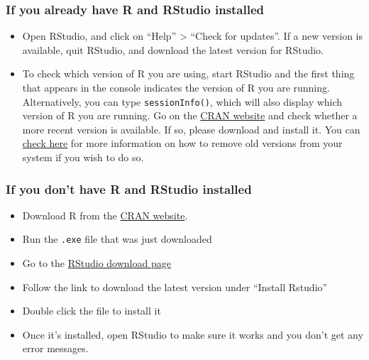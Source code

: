 \documentclass[
]{book}
\providecommand{\tightlist}{%
  \setlength{\itemsep}{0pt}\setlength{\parskip}{0pt}}
\begin{document}
\subsubsection*{If you already have R and RStudio installed}\label{if-you-already-have-r-and-rstudio-installed-1}

\begin{itemize}
\tightlist
\item
  Open RStudio, and click on ``Help'' \textgreater{} ``Check for updates''. If a new version is
  available, quit RStudio, and download the latest version for RStudio.
\item
  To check which version of R you are using, start RStudio and the first thing
  that appears in the console indicates the version of R you are
  running. Alternatively, you can type \texttt{sessionInfo()}, which will also display
  which version of R you are running. Go on
  the \href{https://cran.r-project.org/bin/windows/base/}{CRAN website} and check
  whether a more recent version is available. If so, please download and install
  it. You can \href{https://cran.r-project.org/bin/windows/base/rw-FAQ.html\#How-do-I-UNinstall-R_003f}{check here} for
  more information on how to remove old versions from your system if you wish to do so.
\end{itemize}

\subsubsection*{If you don't have R and RStudio installed}\label{if-you-dont-have-r-and-rstudio-installed-1}

\begin{itemize}
\tightlist
\item
  Download R from
  the \href{http://cran.r-project.org/bin/windows/base/release.htm}{CRAN website}.
\item
  Run the \texttt{.exe} file that was just downloaded
\item
  Go to the \href{https://posit.co/download/rstudio-desktop/}{RStudio download page}
\item
  Follow the link to download the latest version under ``Install Rstudio''
\item
  Double click the file to install it
\item
  Once it's installed, open RStudio to make sure it works and you don't get any
  error messages.
\end{itemize}
\end{document}
